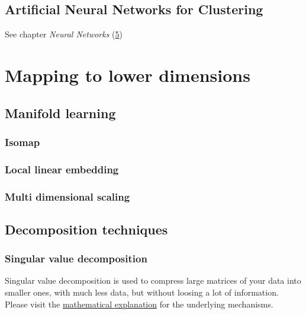 \documentclass[
]{book}
\begin{document}
\hypertarget{artificial-neural-networks-for-clustering}{%
\subsection{Artificial Neural Networks for Clustering}\label{artificial-neural-networks-for-clustering}}

See chapter \emph{Neural Networks}
(\protect\hyperlink{Neuralux5cux2520Networks}{5})

\hypertarget{mapping-to-lower-dimensions}{%
\section{Mapping to lower dimensions}\label{mapping-to-lower-dimensions}}

\hypertarget{manifold-learning}{%
\subsection{Manifold learning}\label{manifold-learning}}

\hypertarget{isomap}{%
\subsubsection{Isomap}\label{isomap}}

\hypertarget{local-linear-embedding}{%
\subsubsection{Local linear embedding}\label{local-linear-embedding}}

\hypertarget{multi-dimensional-scaling}{%
\subsubsection{Multi dimensional scaling}\label{multi-dimensional-scaling}}

\hypertarget{decomposition-techniques}{%
\subsection{Decomposition techniques}\label{decomposition-techniques}}

\hypertarget{SVD2}{%
\subsubsection{Singular value decomposition}\label{SVD2}}

Singular value decomposition is used to compress large matrices of your
data into smaller ones, with much less data, but without loosing a lot
of information. Please visit the \protect\hyperlink{SVD1}{mathematical explanation} for
the underlying mechanisms.\\
\end{document}

